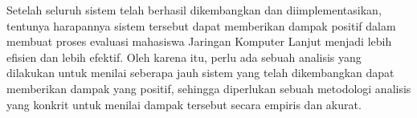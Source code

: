 Setelah seluruh sistem telah berhasil dikembangkan dan diimplementasikan, tentunya harapannya sistem tersebut dapat memberikan dampak positif dalam membuat proses evaluasi mahasiswa Jaringan Komputer
Lanjut menjadi lebih efisien dan lebih efektif. Oleh karena itu, perlu ada sebuah analisis yang dilakukan untuk menilai seberapa jauh sistem yang telah dikembangkan dapat memberikan dampak yang positif,
sehingga diperlukan sebuah metodologi analisis yang konkrit untuk menilai dampak tersebut secara empiris dan akurat.
\par


